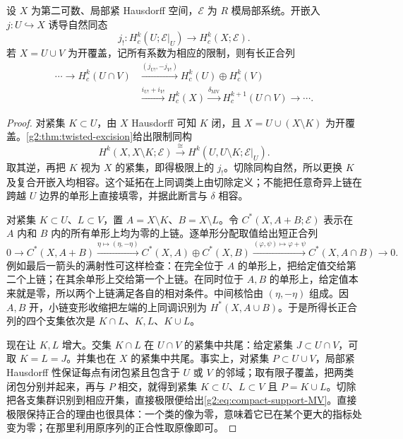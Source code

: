 \begin{proposition}\label{g2:prop:compact-support-MV}
	设 \(X\) 为第二可数、局部紧 Hausdorff 空间，\(\mathcal E\) 为 \(R\) 模局部系统。开嵌入 \(j:U\hookrightarrow X\) 诱导自然同态
	\[
		j_!:H_c^k(U;\mathcal E|_U)\longrightarrow H_c^k(X;\mathcal E).
	\]
	若 \(X=U\cup V\) 为开覆盖，记所有系数为相应的限制，则有长正合列
	\begin{equation}\label{g2:eq:compact-support-MV}
		\begin{aligned}
			\cdots\longrightarrow H_c^k(U\cap V)
			&\xrightarrow{(j_{U!},-j_{V!})}H_c^k(U)\oplus H_c^k(V)\\
			&\xrightarrow{i_{U!}+i_{V!}}H_c^k(X)
			\xrightarrow{\delta_{\mathrm{MV}}}H_c^{k+1}(U\cap V)\longrightarrow\cdots.
		\end{aligned}
	\end{equation}
\end{proposition}
\begin{proof}
	对紧集 \(K\subset U\)，由 \(X\) Hausdorff 可知 \(K\) 闭，且 \(X=U\cup(X\setminus K)\) 为开覆盖。\cref{g2:thm:twisted-excision}给出限制同构
	\[
		H^k(X,X\setminus K;\mathcal E)
		\xrightarrow{\cong}H^k(U,U\setminus K;\mathcal E|_U).
	\]
	取其逆，再把 \(K\) 视为 \(X\) 的紧集，即得极限上的 \(j_!\)。切除同构自然，所以更换 \(K\) 及复合开嵌入均相容。这个延拓在上同调类上由切除定义；不能把任意奇异上链在跨越 \(U\) 边界的单形上直接填零，并据此断言与 \(\delta\) 相容。

	对紧集 \(K\subset U\)、\(L\subset V\)，置 \(A=X\setminus K\)、\(B=X\setminus L\)。令 \(C^*(X,A+B;\mathcal E)\) 表示在 \(A\) 内和 \(B\) 内的所有单形上均为零的上链。逐单形分配取值给出短正合列
	\[
		0\longrightarrow C^*(X,A+B)
		\xrightarrow{\eta\mapsto(\eta,-\eta)}C^*(X,A)\oplus C^*(X,B)
		\xrightarrow{(\varphi,\psi)\mapsto\varphi+\psi}C^*(X,A\cap B)
		\longrightarrow0.
	\]
	例如最后一箭头的满射性可这样检查：在完全位于 \(A\) 的单形上，把给定值交给第二个上链；在其余单形上交给第一个上链。在同时位于 \(A,B\) 的单形上，给定值本来就是零，所以两个上链满足各自的相对条件。中间核恰由 \((\eta,-\eta)\) 组成。因 \(A,B\) 开，小链变形收缩把左端的上同调识别为 \(H^*(X,A\cup B)\)。于是所得长正合列的四个支集依次是 \(K\cap L\)、\(K,L\)、\(K\cup L\)。

	现在让 \(K,L\) 增大。交集 \(K\cap L\) 在 \(U\cap V\) 的紧集中共尾：给定紧集 \(J\subset U\cap V\)，可取 \(K=L=J\)。并集也在 \(X\) 的紧集中共尾。事实上，对紧集 \(P\subset U\cup V\)，局部紧 Hausdorff 性保证每点有闭包紧且包含于 \(U\) 或 \(V\) 的邻域；取有限子覆盖，把两类闭包分别并起来，再与 \(P\) 相交，就得到紧集 \(K\subset U\)、\(L\subset V\) 且 \(P=K\cup L\)。切除把各支集群识别到相应开集，直接极限便给出\eqref{g2:eq:compact-support-MV}。直接极限保持正合的理由也很具体：一个类的像为零，意味着它已在某个更大的指标处变为零；在那里利用原序列的正合性取原像即可。
\end{proof}

